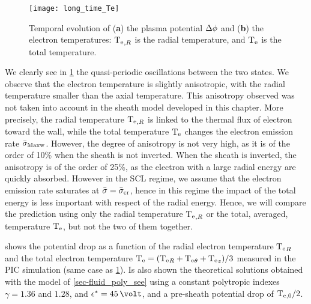      \renewcommand\subfigurewidth{0.7\textwidth}
    \begin{figure}[!hbt]
      \centering
      \texttt{[image: long\_time\_Te]}
      \caption{Temporal evolution of ({\bf a}) the plasma potential $\Delta \phi$ and ({\bf b}) the electron temperatures\string: $\mathrm{T_e}_{,R}$ is the radial temperature, and $\mathrm{T_e}$ is the total temperature.}
      \label{fig-long_time}
    \end{figure}
    \renewcommand\subfigurewidth{0.47\textwidth}
    
    We clearly see in \cref{fig-long_time} the quasi-periodic oscillations between the two states.
    We observe that the electron temperature is slightly anisotropic, with the radial temperature smaller than the axial temperature.
    This anisotropy observed was not taken into account in the sheath model developed in this chapter.
    More precisely, the radial temperature $\mathrm{T_e}_{,R}$ is linked to the thermal flux of electron toward the wall, while the total temperature $\mathrm{T_e}$ changes the electron emission rate $ \bar{\sigma }_{\rm Maxw}$.
    However, the degree of anisotropy is not very high, as it is of the order of 10\% when the sheath is not inverted.
    When the sheath is inverted, the anisotropy is of the order of 25\%, as the electron with a large radial energy are quickly absorbed.
    However in the \ac{SCL} regime, we assume that the electron emission rate saturates at $ \bar{\sigma }= \bar{\sigma }_{\rm cr}$, hence in this regime the impact of the total energy is less important with respect of the radial energy.
    Hence, we will compare the prediction using only the radial temperature $\mathrm{T_e}_{,R}$ or the total, averaged, temperature $\mathrm{T_e}$, but not the two of them together.
    
     shows the potential drop as a function of the radial electron temperature $\mathrm{T_e}_R$ and the total electron temperature $\mathrm{T_e} = (\mathrm{T_e}_R + \mathrm{T_e}_{\theta} + \mathrm{T_e}_z)/3$ measured in the \ac{PIC} simulation (same case as \cref{fig-long_time}).
    Is also shown the theoretical solutions obtained with the model of \cref{sec-fluid_poly_see} using a constant polytropic indexes $\gamma=1.36$ and $1.28$, and $\crover=45\,\volt$, and a pre-sheath potential drop of $\mathrm{T_{e, 0}}/2$.
    
